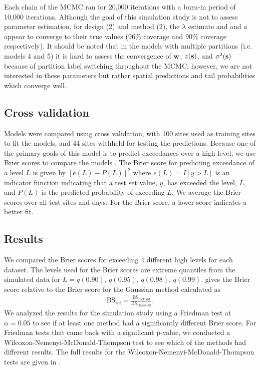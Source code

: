 \documentclass[useAMS,usenatbib,referee]{biom}
\begin{document}
Each chain of the MCMC ran for 20,000 iterations with a burn-in period of 10,000 iterations.
Although the goal of this simulation study is not to assess parameter estimation, for design (2) and method (2), the $\lambda$ estimate and and $a$ appear to converge to their true values (96\% coverage and 90\% coverage respectively).
It should be noted that in the models with multiple partitions (i.e. models 4 and 5) it is hard to assess the convergence of $\mbox{\bf w}$, $z(\mbox{\bf s})$, and $\sigma^2(\mbox{\bf s})$ because of partition label switching throughout the MCMC; however, we are not interested in these parameters but rather spatial predictions and tail probabilities which converge well.

\subsection{Cross validation}\label{sts:modelselect}
Models were compared using cross validation, with 100 sites used as training sites to fit the models, and 44 sites withheld for testing the predictions.
Because one of the primary goals of this model is to predict exceedances over a high level, we use Brier scores to compare the models \citep{Gneiting2007}.
The Brier score for predicting exceedance of a level $L$ is given by $[e(L) - P(L)]^2$ where $e(L) = I[y>L]$ is an indicator function indicating that a test set value, $y$, has exceeded the level, $L$, and $P(L)$ is the predicted probability of exceeding $L$.
We average the Brier scores over all test sites and days.
For the Brier score, a lower score indicates a better fit.

\subsection{Results}\label{sts:simresults}
We compared the Brier scores for exceeding 4 different high levels for each dataset.
The levels used for the Brier scores are extreme quantiles from the simulated data for $L = q(0.90)$, $q(0.95)$, $q(0.98)$, $q(0.99)$.
 gives the Brier score relative to the Brier score for the Gaussian method calculated as
\begin{align}
  \text{BS}_{\text{rel}} = \frac{\text{BS}_{\text{method}}}{\text{BS}_{\text{Gaussian}}}.
\end{align}
We analyzed the results for the simulation study using a Friedman \citep{Hollander2014} test at $\alpha = 0.05$ to see if at least one method had a significantly different Brier score.
For Friedman tests that came back with a significant p-value, we conducted a Wilcoxon-Nemenyi-McDonald-Thompson \citep{Hollander2014} test to see which of the methods had different results.
The full results for the Wilcoxon-Nemenyi-McDonald-Thompson tests are given in .
\end{document}
